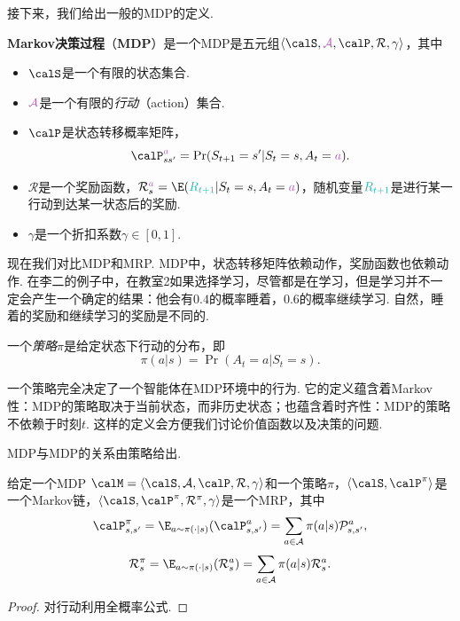 接下来，我们给出一般的MDP的定义.
\begin{definition}
\textbf{Markov决策过程}（\textbf{MDP}）是一个MDP是五元组$\langle\calS, \textcolor{Orchid}{\mathcal A}, \calP, \mathcal R, \gamma\rangle$，其中
\begin{itemize}
    \item $\calS$是一个有限的状态集合.
    \item $\textcolor{Orchid}{\mathcal A}$是一个有限的\emph{行动}（action）集合.
    \item $\calP$是状态转移概率矩阵，
    \[\calP_{ss'}^{\textcolor{Orchid}{a}} = \Pr(S_{t+1} = s' | S_t = s, A_t = \textcolor{Orchid}{a}).\]
    \item $\mathcal R$是一个奖励函数，$\mathcal R_s^{\textcolor{Orchid}{a}} = \E(\textcolor{TealBlue}{R_{t+1}} | S_t = s, A_t = \textcolor{Orchid}{a})$，随机变量$\textcolor{TealBlue}{R_{t+1}}$是进行某一行动到达某一状态后的奖励.
    \item $\gamma$是一个折扣系数$\gamma\in[0,1]$.
\end{itemize}
\end{definition}

现在我们对比MDP和MRP. MDP中，状态转移矩阵依赖动作，奖励函数也依赖动作. 在李二的例子中，在教室2如果选择学习，尽管都是在学习，但是学习并不一定会产生一个确定的结果：他会有$0.4$的概率睡着，$0.6$的概率继续学习. 自然，睡着的奖励和继续学习的奖励是不同的.

\begin{definition}[策略]
一个\emph{策略}$\pi$是给定状态下行动的分布，即
    \[\pi(a|s) = \Pr(A_t=a | S_t = s).\]
\end{definition}
一个策略完全决定了一个智能体在MDP环境中的行为. 它的定义蕴含着Markov性：MDP的策略取决于当前状态，而非历史状态；也蕴含着时齐性：MDP的策略不依赖于时刻$t$. 这样的定义会方便我们讨论价值函数以及决策的问题.

MDP与MDP的关系由策略给出. 
\begin{proposition}
给定一个MDP $\calM=\langle\calS,\mathcal A,\calP,\mathcal R, \gamma\rangle$和一个策略$\pi$，$\langle \calS, \calP^{\pi}\rangle$是一个Markov链，$\langle\calS,\calP^{\pi}, \mathcal R^{\pi}, \gamma\rangle$是一个MRP，其中
\[\calP_{s,s'}^{\pi} = \E_{a\sim\pi(\cdot|s)}(\calP^a_{s,s'})=\sum_{a\in \mathcal A}\pi(a|s)\mathcal P_{s,s'}^{a},\]
    \[\mathcal R_s^{\pi} =\E_{a\sim\pi(\cdot|s)}(\mathcal R^a_s)=\sum_{a\in\mathcal A}\pi(a|s)\mathcal R_s^a.\]
\end{proposition}
\begin{proof}
对行动利用全概率公式. 
\end{proof}

